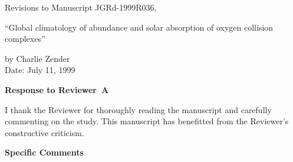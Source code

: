 \documentclass[12pt,twoside]{article}
\begin{document}
 
\noindent
Revisions to Manuscript JGRd-1999R036, \\
\begin{center}\normalsize
``Global climatology of abundance and solar absorption of oxygen
collision complexes'' 
\end{center}
\medskip\noindent
by Charlie Zender \\
\medskip\noindent
Date: July 11, 1999

\medskip\noindent\textbf{Response to Reviewer~A}\medskip

I thank the Reviewer for thoroughly reading the manuscript and
carefully commenting on the study.
This manuscript has benefitted from the Reviewer's constructive
criticism. 

\medskip\noindent\textbf{Specific Comments}
\end{document}
